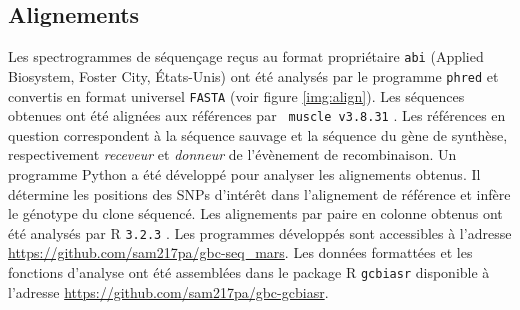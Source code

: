 
\newpage

\subsection{Alignements}
\label{subsec:align}

Les spectrogrammes de séquençage reçus au format propriétaire \texttt{abi}
(Applied Biosystem, Foster City, États-Unis) ont été analysés par le programme
\texttt{phred} \cite{ewing_base-calling_1998} et convertis en format universel
\texttt{FASTA} (voir figure \ref{img:align}). Les séquences obtenues ont été
alignées aux références par \texttt{ muscle v3.8.31} \cite{edgar_muscle:_2004}.
Les références en question correspondent à la séquence sauvage et la séquence du
gène de synthèse, respectivement \emph{receveur} et \emph{donneur} de
l'évènement de recombinaison. Un programme Python \cite{cock_biopython:_2009} a
été développé pour analyser les alignements obtenus. Il détermine les positions
des SNPs d'intérêt dans l'alignement de référence et infère le génotype du clone
séquencé. Les alignements par paire en colonne obtenus ont été analysés par
\textrm{R} \texttt{3.2.3} \cite{r_core_team_r:_2015}. Les programmes développés
sont accessibles à l'adresse \url{https://github.com/sam217pa/gbc-seq_mars}. Les
données formattées et les fonctions d'analyse ont été assemblées dans le package
\textrm{R} \texttt{gcbiasr} disponible à l'adresse
\url{https://github.com/sam217pa/gbc-gcbiasr}.
